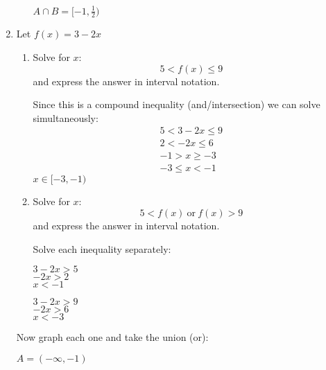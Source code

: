 \documentclass[letterpaper,12pt,fleqn]{article}
\begin{document}
\begin{enumerate}
\begin{enumerate}
    $A\cap B=[-1,\frac{1}{2})$

  \end{enumerate}

\item Let $f(x)=3-2x$
  \begin{enumerate}
  \item Solve for $x$:
    \[5<f(x)\le 9\]
    and express the answer in interval notation.

    Since this is a compound inequality (and/intersection) we can solve simultaneously:
    \[\begin{array}{l}
      5<3-2x\le 9 \\
      2<-2x\le 6 \\
      -1>x\ge -3 \\
      -3\le x< -1
    \end{array}\]
    $x\in[-3,-1)$
    
  \item Solve for $x$:
    \[5<f(x)\ \mbox{or}\ f(x)>9\]
    and express the answer in interval notation.

    Solve each inequality separately:

    \begin{minipage}{3in}
      $3-2x>5$ \\
      $-2x>2$ \\
      $x<-1$
    \end{minipage}
    \begin{minipage}{3in}
      $3-2x>9$ \\
      $-2x>6$ \\
      $x<-3$
    \end{minipage}
  \end{enumerate}

  Now graph each one and take the union (or):
  
    $A=(-\infty,-1)$
    

\end{enumerate}
\end{document}
